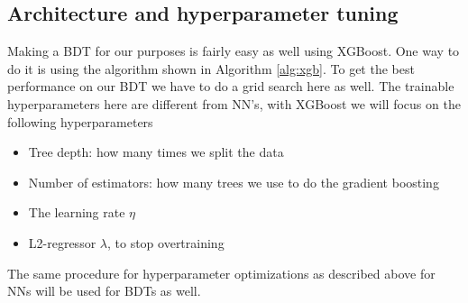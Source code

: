 \documentclass[12pt, a4paper]{book}
\begin{document}
\subsection{Architecture and hyperparameter tuning}\label{sec:BDTGriddy}
Making a BDT for our purposes is fairly easy as well using XGBoost. One way to do it is using the algorithm shown in Algorithm \ref{alg:xgb}. 
To get the best performance on our BDT we have to do a grid search here as well. The trainable hyperparameters here are different from NN's, with XGBoost we will focus on the following hyperparameters
\begin{itemize}
   \item Tree depth: how many times we split the data
   \item Number of estimators: how many trees we use to do the gradient boosting
   \item The learning rate $\eta$
   \item L2-regressor $\lambda$, to stop overtraining
\end{itemize}
The same procedure for hyperparameter optimizations as described above for NNs will be used for BDTs as well.

\newpage
\end{document}
